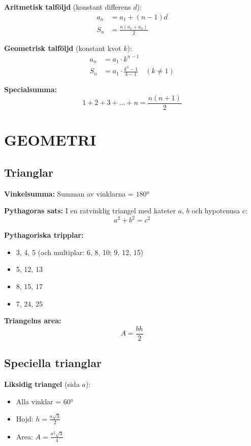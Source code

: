 \documentclass[11pt,a4paper]{article}
\newenvironment{formelbox}{\begin{framed}\color{mainblue}}{\end{framed}}
\begin{document}
\textbf{Aritmetisk talföljd} (konstant differens $d$):
\begin{align}
a_n &= a_1 + (n-1)d \\
S_n &= \frac{n(a_1 + a_n)}{2}
\end{align}

\textbf{Geometrisk talföljd} (konstant kvot $k$):
\begin{align}
a_n &= a_1 \cdot k^{n-1} \\
S_n &= a_1 \cdot \frac{k^n - 1}{k - 1} \quad (k \neq 1)
\end{align}

\textbf{Specialsumma:}
\[ 1 + 2 + 3 + \ldots + n = \frac{n(n+1)}{2} \]

\section{GEOMETRI}

\subsection{Trianglar}

\textbf{Vinkelsumma:} Summan av vinklarna = $180°$

\begin{formelbox}
\textbf{Pythagoras sats:} I en ratvinklig triangel med kateter $a$, $b$ och hypotenusa $c$:
\[ a^2 + b^2 = c^2 \]
\end{formelbox}

\textbf{Pythagoriska tripplar:}
\begin{itemize}
\item 3, 4, 5 (och multiplar: 6, 8, 10; 9, 12, 15)
\item 5, 12, 13
\item 8, 15, 17
\item 7, 24, 25
\end{itemize}

\textbf{Triangelns area:}
\[ A = \frac{bh}{2} \]

\subsection{Speciella trianglar}

\textbf{Liksidig triangel} (sida $a$):
\begin{itemize}
\item Alla vinklar = $60°$
\item Hojd: $h = \frac{a\sqrt{3}}{2}$
\item Area: $A = \frac{a^2\sqrt{3}}{4}$
\end{itemize}
\end{document}

